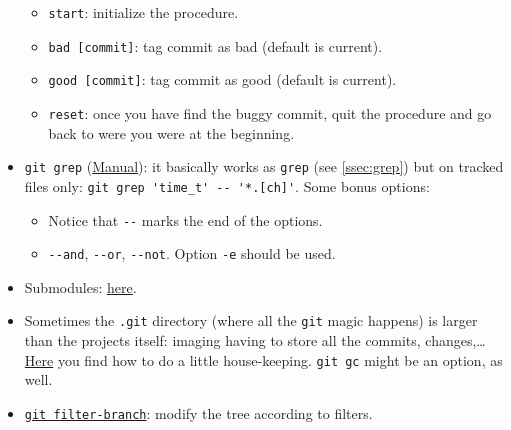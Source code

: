 \documentclass[a4paper,12pt,%
              final%
              ]{article}
\begin{document}
\begin{itemize}
\begin{itemize}
      \item \verb|start|: initialize the procedure.
      \item \verb|bad [commit]|: tag commit as bad (default is current).
      \item \verb|good [commit]|: tag commit as good (default is current).
      \item \verb|reset|: once you have find the buggy commit, quit the procedure and go back to were you were at the beginning.
    \end{itemize}
  \item \verb|git grep| (\href{https://git-scm.com/docs/git-grep}{Manual}): it basically works as \verb|grep| (see \autoref{ssec:grep}) but on tracked files only: \verb|git grep 'time_t' -- '*.[ch]'|. Some bonus options:
    \begin{itemize}
      \item Notice that \verb|--| marks the end of the options.
      \item \verb|--and|, \verb|--or|, \verb|--not|. Option \verb|-e| should be used.
    \end{itemize}
  \item Submodules: \href{https://git-scm.com/book/en/v2/Git-Tools-Submodules}{here}.
  \item Sometimes the \texttt{.git} directory (where all the \texttt{git} magic happens) is larger than the projects itself: imaging having to store all the commits, changes,\ldots{} \href{https://stackoverflow.com/questions/5277467/how-can-i-clean-my-git-folder-cleaned-up-my-project-directory-but-git-is-sti}{Here} you find how to do a little house-keeping. \verb|git gc| might be an option, as well.
  \item \href{https://git-scm.com/docs/git-filter-branch}{\texttt{git filter-branch}}: modify the tree according to filters.

\end{itemize}


\end{document}
